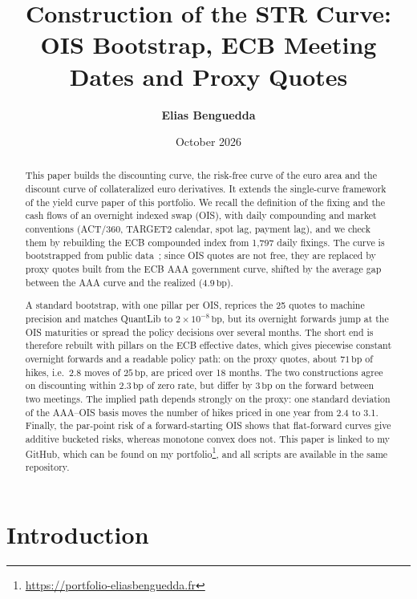 \documentclass[11pt,a4paper]{article}
\title{\textbf{Construction of the \texteuro STR Curve:\\
OIS Bootstrap, ECB Meeting Dates and Proxy Quotes}}
\author{\textbf{Elias Benguedda}}
\date{October 2026}
\theoremstyle{plain}
\theoremstyle{definition}
\newcommand{\bp}{\,\mathrm{bp}}
\newcommand{\estr}{\text{\texteuro STR}}
\begin{document}
\maketitle

\begin{abstract}
This paper builds the \estr{} discounting curve, the risk-free curve of the euro area and the discount curve of collateralized euro derivatives. It extends the single-curve framework of the yield curve paper of this portfolio. We recall the definition of the \estr{} fixing and the cash flows of an overnight indexed swap (OIS), with daily compounding and market conventions (ACT/360, TARGET2 calendar, spot lag, payment lag), and we check them by rebuilding the ECB compounded \estr{} index from 1,797 daily fixings. The curve is bootstrapped from public data~\cite{data}; since \estr{} OIS quotes are not free, they are replaced by proxy quotes built from the ECB AAA government curve, shifted by the average gap between the AAA curve and the realized \estr{} ($4.9\bp$).

A standard bootstrap, with one pillar per OIS, reprices the 25 quotes to machine precision and matches QuantLib to $2\times10^{-8}\bp$, but its overnight forwards jump at the OIS maturities or spread the policy decisions over several months. The short end is therefore rebuilt with pillars on the ECB effective dates, which gives piecewise constant overnight forwards and a readable policy path: on the proxy quotes, about $71\bp$ of hikes, i.e.\ 2.8 moves of $25\bp$, are priced over 18 months. The two constructions agree on discounting within $2.3\bp$ of zero rate, but differ by $3\bp$ on the forward between two meetings. The implied path depends strongly on the proxy: one standard deviation of the AAA--OIS basis moves the number of hikes priced in one year from 2.4 to 3.1. Finally, the par-point risk of a forward-starting OIS shows that flat-forward curves give additive bucketed risks, whereas monotone convex does not. This paper is linked to my GitHub, which can be found on my portfolio\footnote{\url{https://portfolio-eliasbenguedda.fr}}, and all scripts are available in the same repository.
\end{abstract}

\clearpage

\tableofcontents
\newpage

\section{Introduction}
\label{sec:intro}
\end{document}
